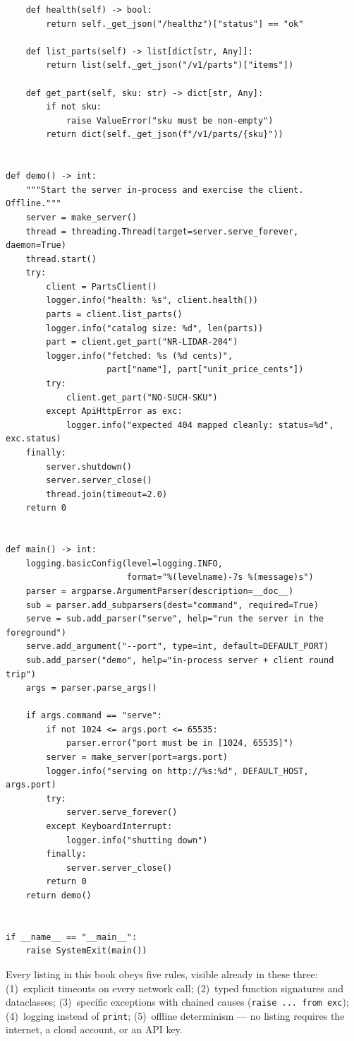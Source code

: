 \begin{verbatim}
    def health(self) -> bool:
        return self._get_json("/healthz")["status"] == "ok"

    def list_parts(self) -> list[dict[str, Any]]:
        return list(self._get_json("/v1/parts")["items"])

    def get_part(self, sku: str) -> dict[str, Any]:
        if not sku:
            raise ValueError("sku must be non-empty")
        return dict(self._get_json(f"/v1/parts/{sku}"))


def demo() -> int:
    """Start the server in-process and exercise the client. Offline."""
    server = make_server()
    thread = threading.Thread(target=server.serve_forever, daemon=True)
    thread.start()
    try:
        client = PartsClient()
        logger.info("health: %s", client.health())
        parts = client.list_parts()
        logger.info("catalog size: %d", len(parts))
        part = client.get_part("NR-LIDAR-204")
        logger.info("fetched: %s (%d cents)",
                    part["name"], part["unit_price_cents"])
        try:
            client.get_part("NO-SUCH-SKU")
        except ApiHttpError as exc:
            logger.info("expected 404 mapped cleanly: status=%d", exc.status)
    finally:
        server.shutdown()
        server.server_close()
        thread.join(timeout=2.0)
    return 0


def main() -> int:
    logging.basicConfig(level=logging.INFO,
                        format="%(levelname)-7s %(message)s")
    parser = argparse.ArgumentParser(description=__doc__)
    sub = parser.add_subparsers(dest="command", required=True)
    serve = sub.add_parser("serve", help="run the server in the foreground")
    serve.add_argument("--port", type=int, default=DEFAULT_PORT)
    sub.add_parser("demo", help="in-process server + client round trip")
    args = parser.parse_args()

    if args.command == "serve":
        if not 1024 <= args.port <= 65535:
            parser.error("port must be in [1024, 65535]")
        server = make_server(port=args.port)
        logger.info("serving on http://%s:%d", DEFAULT_HOST, args.port)
        try:
            server.serve_forever()
        except KeyboardInterrupt:
            logger.info("shutting down")
        finally:
            server.server_close()
        return 0
    return demo()


if __name__ == "__main__":
    raise SystemExit(main())
\end{verbatim}
\label{lst:ch0-miniapi}

\begin{keyconceptbox}
Every listing in this book obeys five rules, visible already in these three:
(1)~explicit timeouts on every network call; (2)~typed function signatures
and dataclasses; (3)~specific exceptions with chained causes
(\texttt{raise ... from exc}); (4)~logging instead of \texttt{print};
(5)~offline determinism --- no listing requires the internet, a cloud
account, or an API key.
\end{keyconceptbox}
